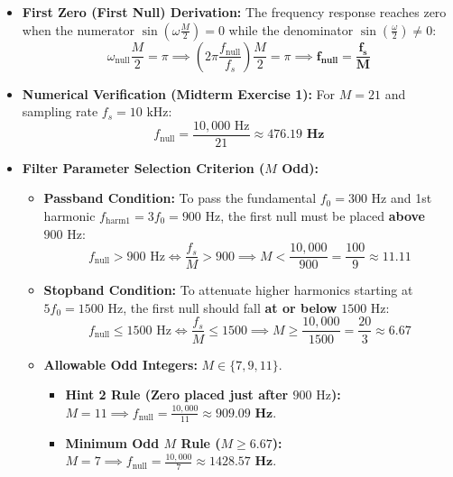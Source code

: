 \documentclass[10pt,a4paper]{article}
\begin{document}
\begin{itemize}[leftmargin=12pt, itemsep=1.5pt, topsep=1pt]
    \item \textbf{First Zero (First Null) Derivation:} The frequency response reaches zero when the numerator $\sin\left(\omega \frac{M}{2}\right) = 0$ while the denominator $\sin\left(\frac{\omega}{2}\right) \ne 0$:
    \begin{equation}
        \omega_{\text{null}} \frac{M}{2} = \pi \implies \left(2\pi \frac{f_{\text{null}}}{f_s}\right) \frac{M}{2} = \pi \implies \mathbf{f_{\text{null}} = \frac{f_s}{M}}
    \end{equation}
    \item \textbf{Numerical Verification (Midterm Exercise 1):} For $M = 21$ and sampling rate $f_s = 10\text{ kHz}$:
    \[
    f_{\text{null}} = \frac{10,000\text{ Hz}}{21} \approx \mathbf{476.19\text{ Hz}}
    \]
    \item \textbf{Filter Parameter Selection Criterion ($M$ Odd):}
    \begin{itemize}[leftmargin=10pt, itemsep=0.5pt]
        \item \textbf{Passband Condition:} To pass the fundamental $f_0 = 300\text{ Hz}$ and 1st harmonic $f_{\text{harm1}} = 3f_0 = 900\text{ Hz}$, the first null must be placed \textbf{above} $900\text{ Hz}$:
        \[
        f_{\text{null}} > 900\text{ Hz} \iff \frac{f_s}{M} > 900 \implies M < \frac{10,000}{900} = \frac{100}{9} \approx 11.11
        \]
        \item \textbf{Stopband Condition:} To attenuate higher harmonics starting at $5f_0 = 1500\text{ Hz}$, the first null should fall \textbf{at or below} $1500\text{ Hz}$:
        \[
        f_{\text{null}} \le 1500\text{ Hz} \iff \frac{f_s}{M} \le 1500 \implies M \ge \frac{10,000}{1500} = \frac{20}{3} \approx 6.67
        \]
        \item \textbf{Allowable Odd Integers:} $M \in \{7, 9, 11\}$.
        \begin{itemize}[leftmargin=8pt, itemsep=0.5pt]
            \item \textbf{Hint 2 Rule (Zero placed just after $900\text{ Hz}$):} $M = 11 \implies f_{\text{null}} = \frac{10,000}{11} \approx \mathbf{909.09\text{ Hz}}$.
            \item \textbf{Minimum Odd $M$ Rule ($M \ge 6.67$):} $M = 7 \implies f_{\text{null}} = \frac{10,000}{7} \approx \mathbf{1428.57\text{ Hz}}$.
        \end{itemize}
    \end{itemize}
\end{itemize}
\end{document}
